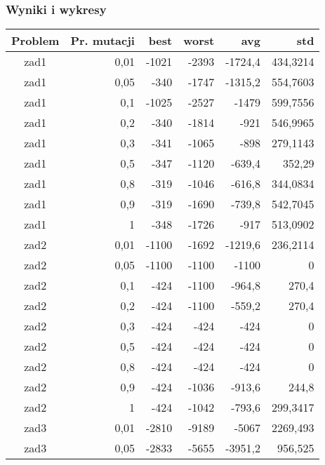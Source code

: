 \documentclass[12pt,a4paper]{article}
\begin{document}
\subsubsection{Wyniki i wykresy}
\begin{table}[htbp]
  \centering
    \begin{tabular}{crrrrr}
    \multicolumn{1}{p{4.215em}}{\textbf{Problem}} & \multicolumn{1}{p{5.57em}}{\textbf{Pr. mutacji}} & \multicolumn{1}{p{4.215em}}{\textbf{best}} & \multicolumn{1}{p{4.215em}}{\textbf{worst}} & \multicolumn{1}{p{4.215em}}{\textbf{avg}} & \multicolumn{1}{p{4.215em}}{\textbf{std}} \\
    \midrule
    zad1  & 0,01  & -1021 & -2393 & -1724,4 & 434,3214 \\
    zad1  & 0,05  & -340  & -1747 & -1315,2 & 554,7603 \\
    zad1  & 0,1   & -1025 & -2527 & -1479 & 599,7556 \\
    zad1  & 0,2   & -340  & -1814 & -921  & 546,9965 \\
    zad1  & 0,3   & -341  & -1065 & -898  & 279,1143 \\
    zad1  & 0,5   & -347  & -1120 & -639,4 & 352,29 \\
    zad1  & 0,8   & -319  & -1046 & -616,8 & 344,0834 \\
    zad1  & 0,9   & -319  & -1690 & -739,8 & 542,7045 \\
    zad1  & 1     & -348  & -1726 & -917  & 513,0902 \\
    \midrule
    zad2  & 0,01  & -1100 & -1692 & -1219,6 & 236,2114 \\
    zad2  & 0,05  & -1100 & -1100 & -1100 & 0 \\
    zad2  & 0,1   & -424  & -1100 & -964,8 & 270,4 \\
    zad2  & 0,2   & -424  & -1100 & -559,2 & 270,4 \\
    zad2  & 0,3   & -424  & -424  & -424  & 0 \\
    zad2  & 0,5   & -424  & -424  & -424  & 0 \\
    zad2  & 0,8   & -424  & -424  & -424  & 0 \\
    zad2  & 0,9   & -424  & -1036 & -913,6 & 244,8 \\
    zad2  & 1     & -424  & -1042 & -793,6 & 299,3417 \\
    \midrule
    zad3  & 0,01  & -2810 & -9189 & -5067 & 2269,493 \\
    zad3  & 0,05  & -2833 & -5655 & -3951,2 & 956,525 \\

\end{tabular}
\end{table}
\end{document}

